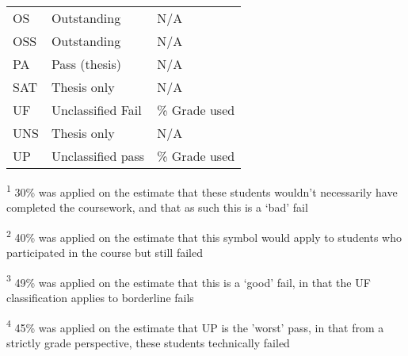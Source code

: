 \begin{table}[H]
\begin{threeparttable}
\begin{tabularx}{\textwidth}{>{\hsize=0.6\hsize}X>{\hsize=1.3\hsize}X>{\hsize=1.1\hsize}X}
            OS             & Outstanding              & N/A                                        \\
            OSS            & Outstanding              & N/A                                        \\
            PA             & Pass (thesis)            & N/A                                        \\
            SAT            & Thesis only              & N/A                                        \\
            UF             & Unclassified Fail        & 49\% Grade used\tnote{\textsuperscript{3}} \\
            UNS            & Thesis only              & N/A                                        \\
            UP             & Unclassified pass        & 45\% Grade used\tnote{\textsuperscript{4}} \\
            \bottomrule
        \end{tabularx}
        \scriptsize
        \begin{tablenotes}
            \item[\textsuperscript{1}]30\% was applied on the estimate that these students wouldn't necessarily have completed the coursework, and that as such this is a `bad' fail
            \item[\textsuperscript{2}]40\% was applied on the estimate that this symbol would apply to students who participated in the course but still failed
            \item[\textsuperscript{3}]49\% was applied on the estimate that this is a `good' fail, in that the UF classification applies to borderline fails
            \item[\textsuperscript{4}]45\% was applied on the estimate that UP is the 'worst' pass, in that from a strictly grade perspective, these students technically failed
        \end{tablenotes}
    \end{threeparttable}
\end{table}